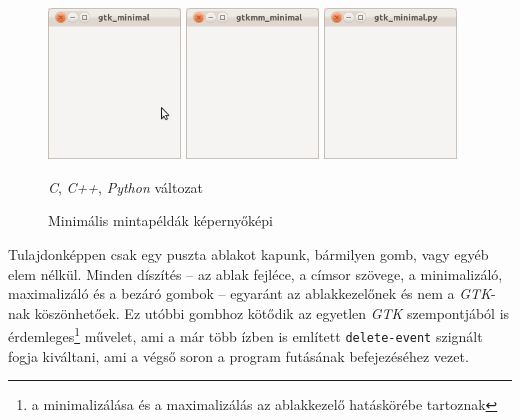 \begin{figure}[ht]
\begin{center}
\includegraphics[height=40mm]{images/screenshot_gtk_minimal.png}\hspace{0.05\textwidth}
\includegraphics[height=40mm]{images/screenshot_gtkmm_minimal.png}\hspace{0.05\textwidth}
\includegraphics[height=40mm]{images/screenshot_gtkpy_minimal.png}
\caption{Minimális mintapéldák képernyőképi}{\textit{C}, \textit{C++}, \textit{Python} változat}
\label{fig:screenshotminimap}
\end{center}
\end{figure}

Tulajdonképpen csak egy puszta ablakot kapunk, bármilyen gomb, vagy egyéb elem nélkül. Minden díszítés -- az ablak fejléce, a címsor szövege, a minimalizáló, maximalizáló és a bezáró gombok -- egyaránt az ablakkezelőnek és nem a \textit{GTK}-nak köszönhetőek. Ez utóbbi gombhoz kötődik az egyetlen \textit{GTK} szempontjából is érdemleges\footnote{a minimalizálása és a maximalizálás az ablakkezelő hatáskörébe tartoznak} művelet, ami a már több ízben is említett \texttt{delete-event} szignált fogja kiváltani, ami a végső soron a program futásának befejezéséhez vezet.

